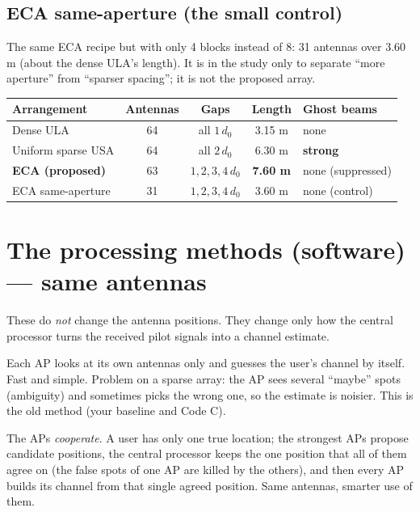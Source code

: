 \documentclass[11pt]{article}
\begin{document}
\subsection{ECA same-aperture (the small control)}
The same ECA recipe but with only 4 blocks instead of 8: 31 antennas over 3.60\,m (about the
dense ULA's length). It is in the study only to separate ``more aperture'' from ``sparser
spacing''; it is not the proposed array.

\begin{center}
\renewcommand{\arraystretch}{1.22}
\begin{tabular}{@{}lcccp{4.2cm}@{}}
\toprule
Arrangement & Antennas & Gaps & Length & Ghost beams\\
\midrule
Dense ULA           & 64 & all $1\,d_0$      & 3.15 m & none\\
Uniform sparse USA  & 64 & all $2\,d_0$      & 6.30 m & \textbf{strong}\\
\textbf{ECA (proposed)} & 63 & $1,2,3,4\,d_0$ & \textbf{7.60 m} & none (suppressed)\\
ECA same-aperture   & 31 & $1,2,3,4\,d_0$   & 3.60 m & none (control)\\
\bottomrule
\end{tabular}
\end{center}

\section{The processing methods (software) --- same antennas}

These do \emph{not} change the antenna positions. They change only how the central processor turns
the received pilot signals into a channel estimate.

\begin{description}[leftmargin=0pt,itemsep=4pt]
\item[\textbf{``local'' estimation.}] Each AP looks at its own antennas only and guesses the
  user's channel by itself. Fast and simple. Problem on a sparse array: the AP sees several
  ``maybe'' spots (ambiguity) and sometimes picks the wrong one, so the estimate is noisier. This
  is the old method (your baseline and Code C).
\item[\textbf{``CAPE'' estimation (proposed).}] The APs \emph{cooperate}. A user has only one true
  location; the strongest APs propose candidate positions, the central processor keeps the one
  position that all of them agree on (the false spots of one AP are killed by the others), and
  then every AP builds its channel from that single agreed position. Same antennas, smarter use of
  them.
\end{description}
\end{document}
